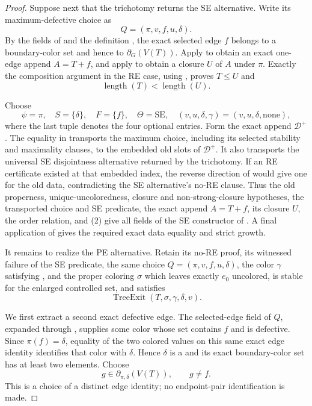 \begin{proof}
Suppose next that the trichotomy returns the SE alternative.  Write its
maximum-defective choice as
\[
                Q=(\pi,v,f,u,\delta).
\]
By the fields of  and the definition
, the exact selected edge \(f\) belongs to a
boundary-color set and hence to \(\partial_G(V(T))\).  Apply
 to obtain an exact
one-edge append \(A=T+f\), and apply
 to obtain a closure \(U\) of \(A\)
under \(\pi\).  Exactly the composition argument in the RE case, using
, proves
\(T\leq U\) and
\[
                     \operatorname{length}(T)<\operatorname{length}(U).
                                                                    \tag{2}
\]

Choose
\[
 \psi=\pi,\quad S=\{\delta\},\quad F=\{f\},\quad
 \Theta=\mathrm{SE},\quad
 (v,u,\delta,\gamma)=(v,u,\delta,\mathrm{none}),
\]
where the last tuple denotes the four optional entries.  Form the exact
append \(\mathcal D^+\).  The equality in
 transports the maximum choice,
including its selected stability and maximality clauses, to the embedded
old slots of \(\mathcal D^+\).  It also transports the universal SE
disjointness alternative returned by the trichotomy.  If an RE
certificate existed at that embedded index, the reverse direction of
 would give one for the
old data, contradicting the SE alternative's no-RE clause.  Thus the
old properness, unique-uncoloredness, closure and non-strong-closure
hypotheses, the transported choice and SE predicate, the exact append
\(A=T+f\), its closure \(U\), the order relation, and (2) give all fields
of the SE constructor of .  A final
application of  gives the required exact
data equality and strict growth.

It remains to realize the PE alternative.  Retain its no-RE proof, its
witnessed failure of the SE predicate, the same choice
\(Q=(\pi,v,f,u,\delta)\), the color \(\gamma\) satisfying
, and the proper coloring \(\sigma\)
which leaves exactly \(e_0\) uncolored, is stable for the enlarged
controlled set, and satisfies
\[
                    \operatorname{TreeExit}(T,\sigma,\gamma,\delta,v).
                                                                    \tag{3}
\]

We first extract a second exact defective edge.  The selected-edge field
of \(Q\), expanded through , supplies some color
whose  set contains \(f\) and is defective.
Since \(\pi(f)=\delta\), equality of the two colored values on this same
exact edge identity identifies that color with \(\delta\).  Hence
\(\delta\) is a  and its exact boundary-color
set has at least two elements.  Choose
\[
 g\in\partial_{\pi,\delta}(V(T)),\qquad g\ne f.              \tag{4}
\]
This is a choice of a distinct edge identity; no endpoint-pair
identification is made.


\end{proof}
